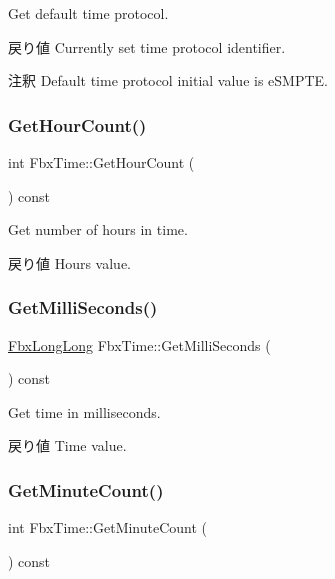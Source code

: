 Get default time protocol. \begin{DoxyReturn}{戻り値}
Currently set time protocol identifier. 
\end{DoxyReturn}
\begin{DoxyRemark}{注釈}
Default time protocol initial value is e\+S\+M\+P\+TE. 
\end{DoxyRemark}
\mbox{\label{class_fbx_time_acd535f01e345e54e3f3bb0c12c482d37}} 
\subsubsection{\texorpdfstring{Get\+Hour\+Count()}{GetHourCount()}}
{\footnotesize\ttfamily int Fbx\+Time\+::\+Get\+Hour\+Count (\begin{DoxyParamCaption}{ }\end{DoxyParamCaption}) const}

Get number of hours in time. \begin{DoxyReturn}{戻り値}
Hours value. 
\end{DoxyReturn}
\mbox{\label{class_fbx_time_a221649a9e998cd387df4116068322553}} 
\subsubsection{\texorpdfstring{Get\+Milli\+Seconds()}{GetMilliSeconds()}}
{\footnotesize\ttfamily \hyperlink{fbxtypes_8h_ac34da60c22b0a7e1156e5480da7d71f1}{Fbx\+Long\+Long} Fbx\+Time\+::\+Get\+Milli\+Seconds (\begin{DoxyParamCaption}{ }\end{DoxyParamCaption}) const}

Get time in milliseconds. \begin{DoxyReturn}{戻り値}
Time value. 
\end{DoxyReturn}
\mbox{\label{class_fbx_time_aa8c9ef48cd8d43e83e1c3bb42d62ca95}} 
\subsubsection{\texorpdfstring{Get\+Minute\+Count()}{GetMinuteCount()}}
{\footnotesize\ttfamily int Fbx\+Time\+::\+Get\+Minute\+Count (\begin{DoxyParamCaption}{ }\end{DoxyParamCaption}) const}

